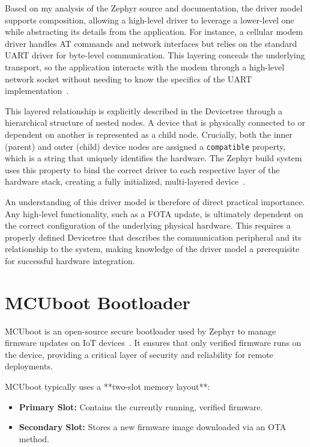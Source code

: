 Based on my analysis of the Zephyr source and documentation, the driver model supports composition, allowing a high-level driver to leverage a lower-level one while abstracting its details from the application. For instance, a cellular modem driver handles AT commands and network interfaces but relies on the standard UART driver for byte-level communication. This layering conceals the underlying transport, so the application interacts with the modem through a high-level network socket without needing to know the specifics of the UART implementation~\cite{zephyr_device_driver_model}.

This layered relationship is explicitly described in the Devicetree through a hierarchical structure of nested nodes. A device that is physically connected to or dependent on another is represented as a child node. Crucially, both the inner (parent) and outer (child) device nodes are assigned a \texttt{compatible} property, which is a string that uniquely identifies the hardware. The Zephyr build system uses this property to bind the correct driver to each respective layer of the hardware stack, creating a fully initialized, multi-layered device~\cite{zephyr_device_driver_model}.

An understanding of this driver model is therefore of direct practical importance. Any high-level functionality, such as a FOTA update, is ultimately dependent on the correct configuration of the underlying physical hardware. This requires a properly defined Devicetree that describes the communication peripheral and its relationship to the system, making knowledge of the driver model a prerequisite for successful hardware integration.

\section{MCUboot Bootloader}

MCUboot is an open-source secure bootloader used by Zephyr to manage firmware updates on IoT devices~\cite{mcuboot_design}. It ensures that only verified firmware runs on the device, providing a critical layer of security and reliability for remote deployments.

MCUboot typically uses a **two-slot memory layout**:  
\begin{itemize}
    \item \textbf{Primary Slot:} Contains the currently running, verified firmware.  
    \item \textbf{Secondary Slot:} Stores a new firmware image downloaded via an OTA method.  
\end{itemize}

